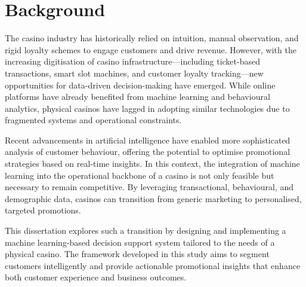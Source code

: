 \section{Background}

The casino industry has historically relied on intuition, manual observation, and rigid loyalty schemes to engage customers and drive revenue. However, with the increasing digitisation of casino infrastructure—including ticket-based transactions, smart slot machines, and customer loyalty tracking—new opportunities for data-driven decision-making have emerged. While online platforms have already benefited from machine learning and behavioural analytics, physical casinos have lagged in adopting similar technologies due to fragmented systems and operational constraints.

Recent advancements in artificial intelligence have enabled more sophisticated analysis of customer behaviour, offering the potential to optimise promotional strategies based on real-time insights. In this context, the integration of machine learning into the operational backbone of a casino is not only feasible but necessary to remain competitive. By leveraging transactional, behavioural, and demographic data, casinos can transition from generic marketing to personalised, targeted promotions.

This dissertation explores such a transition by designing and implementing a machine learning-based decision support system tailored to the needs of a physical casino. The framework developed in this study aims to segment customers intelligently and provide actionable promotional insights that enhance both customer experience and business outcomes.
